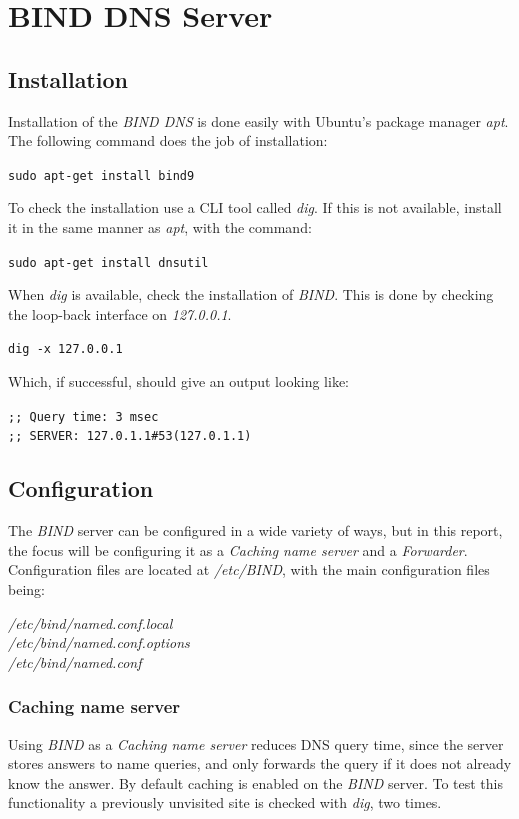 \section{BIND DNS Server}
\label{sec:binddnsserver}

\subsection{Installation}
Installation of the \emph{BIND DNS} is done easily with Ubuntu's package manager \emph{apt}. The following command does the job of installation:

\texttt{sudo apt-get install bind9}

To check the installation use a CLI tool called \emph{dig}. If this is not available, install it in the same manner as \emph{apt}, with the command:

\texttt{sudo apt-get install dnsutil}

When \emph{dig} is available, check the installation of \emph{BIND}. This is done by checking the loop-back interface on \emph{127.0.0.1}.

\texttt{dig -x 127.0.0.1}

Which, if successful, should give an output looking like:

\texttt{;; Query time: 3 msec}\\
\texttt{;; SERVER: 127.0.1.1\#53(127.0.1.1)}

\subsection{Configuration}
The \emph{BIND} server can be configured in a wide variety of ways, but in this report, the focus will be configuring it as a \emph{Caching name server} and a \emph{Forwarder}. Configuration files are located at \emph{/etc/BIND}, with the main configuration files being:

\emph{/etc/bind/named.conf.local}\\
\emph{/etc/bind/named.conf.options}\\
\emph{/etc/bind/named.conf}\\

\subsubsection{Caching name server}
Using \emph{BIND} as a \emph{Caching name server} reduces DNS query time, since the server stores answers to name queries, and only forwards the query if it does not already know the answer.
By default caching is enabled on the \emph{BIND} server. To test this functionality a previously unvisited site is checked with \emph{dig}, two times.

